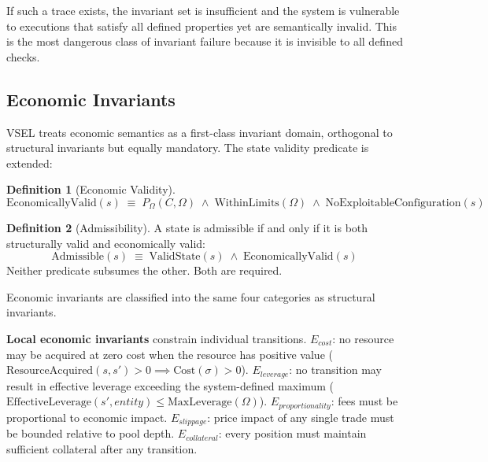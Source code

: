 \documentclass[11pt,a4paper]{article}
\theoremstyle{definition}
\newtheorem{definition}{Definition}[section]
\newcommand{\ValidState}{\mathrm{ValidState}}
\begin{document}
If such a trace exists, the invariant set is insufficient and the system is vulnerable to executions that satisfy all defined properties yet are semantically invalid. This is the most dangerous class of invariant failure because it is invisible to all defined checks.

\subsection{Economic Invariants}
\label{subsec:economic-invariants}

VSEL treats economic semantics as a first-class invariant domain, orthogonal to structural invariants but equally mandatory. The state validity predicate is extended:

\begin{definition}[Economic Validity]
\label{def:economic-validity}
\begin{equation}
\mathrm{EconomicallyValid}(s) \;\equiv\; P_\Omega(C, \Omega) \;\land\; \mathrm{WithinLimits}(\Omega) \;\land\; \mathrm{NoExploitableConfiguration}(s)
\end{equation}
\end{definition}

\begin{definition}[Admissibility]
\label{def:admissibility}
A state is admissible if and only if it is both structurally valid and economically valid:
\begin{equation}
\mathrm{Admissible}(s) \;\equiv\; \ValidState(s) \;\land\; \mathrm{EconomicallyValid}(s)
\end{equation}
Neither predicate subsumes the other. Both are required.
\end{definition}

Economic invariants are classified into the same four categories as structural invariants.

\noindent\textbf{Local economic invariants} constrain individual transitions. $E_{\mathit{cost}}$: no resource may be acquired at zero cost when the resource has positive value ($\mathrm{ResourceAcquired}(s, s') > 0 \implies \mathrm{Cost}(\sigma) > 0$). $E_{\mathit{leverage}}$: no transition may result in effective leverage exceeding the system-defined maximum ($\mathrm{EffectiveLeverage}(s', \mathit{entity}) \leq \mathrm{MaxLeverage}(\Omega)$). $E_{\mathit{proportionality}}$: fees must be proportional to economic impact. $E_{\mathit{slippage}}$: price impact of any single trade must be bounded relative to pool depth. $E_{\mathit{collateral}}$: every position must maintain sufficient collateral after any transition.
\end{document}
